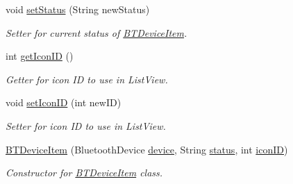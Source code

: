 \begin{DoxyCompactItemize}
void \hyperlink{classcom_1_1jack_1_1motorbikestatistics_1_1_b_t_device_item_a4e3d0774e91c5261963b03d6dcb08561}{set\+Status} (String new\+Status)
\begin{DoxyCompactList}\small\item\em Setter for current status of \hyperlink{classcom_1_1jack_1_1motorbikestatistics_1_1_b_t_device_item}{B\+T\+Device\+Item}. \end{DoxyCompactList}\item 
int \hyperlink{classcom_1_1jack_1_1motorbikestatistics_1_1_b_t_device_item_a9e16b980dbddfdb9347ffa6237b78de5}{get\+Icon\+ID} ()
\begin{DoxyCompactList}\small\item\em Getter for icon ID to use in List\+View. \end{DoxyCompactList}\item 
void \hyperlink{classcom_1_1jack_1_1motorbikestatistics_1_1_b_t_device_item_a40eb2a1f46700690d2327bf37bc5ed0e}{set\+Icon\+ID} (int new\+ID)
\begin{DoxyCompactList}\small\item\em Setter for icon ID to use in List\+View. \end{DoxyCompactList}\item 
\hyperlink{classcom_1_1jack_1_1motorbikestatistics_1_1_b_t_device_item_addc508fe41b31b9e13a9105464a627ac}{B\+T\+Device\+Item} (Bluetooth\+Device \hyperlink{classcom_1_1jack_1_1motorbikestatistics_1_1_b_t_device_item_acd943b008d77dcb5d72f8a65fa4986b9}{device}, String \hyperlink{classcom_1_1jack_1_1motorbikestatistics_1_1_b_t_device_item_ae7a8756973644c5719d5faddf3fa7946}{status}, int \hyperlink{classcom_1_1jack_1_1motorbikestatistics_1_1_b_t_device_item_a77f7a3c228f87fa5e946fe77b310f805}{icon\+ID})
\begin{DoxyCompactList}\small\item\em Constructor for \hyperlink{classcom_1_1jack_1_1motorbikestatistics_1_1_b_t_device_item}{B\+T\+Device\+Item} class. \end{DoxyCompactList}\end{DoxyCompactItemize}
